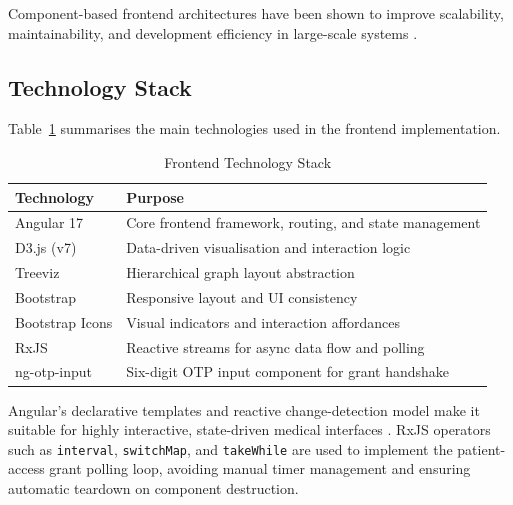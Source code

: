 Component-based frontend architectures have been shown to improve scalability,
maintainability, and development efficiency in large-scale systems
\cite{componentFrontEnd2021}.

\subsection{Technology Stack}

Table~\ref{tab:frontend_stack} summarises the main technologies used in the
frontend implementation.

\begin{table}[H]
    \centering
    \caption{Frontend Technology Stack}
    \label{tab:frontend_stack}
    \begin{tabular}{|l|l|}
        \hline
        \textbf{Technology} & \textbf{Purpose}                                    \\
        \hline
        Angular 17          & Core frontend framework, routing, and state management \\
        D3.js (v7)          & Data-driven visualisation and interaction logic      \\
        Treeviz             & Hierarchical graph layout abstraction                \\
        Bootstrap           & Responsive layout and UI consistency                 \\
        Bootstrap Icons     & Visual indicators and interaction affordances        \\
        RxJS                & Reactive streams for async data flow and polling     \\
        ng-otp-input        & Six-digit OTP input component for grant handshake    \\
        \hline
    \end{tabular}
\end{table}

Angular's declarative templates and reactive change-detection model make it
suitable for highly interactive, state-driven medical interfaces
\cite{angularDocs}. RxJS operators such as \texttt{interval}, \texttt{switchMap},
and \texttt{takeWhile} are used to implement the patient-access grant polling
loop, avoiding manual timer management and ensuring automatic teardown on
component destruction.

